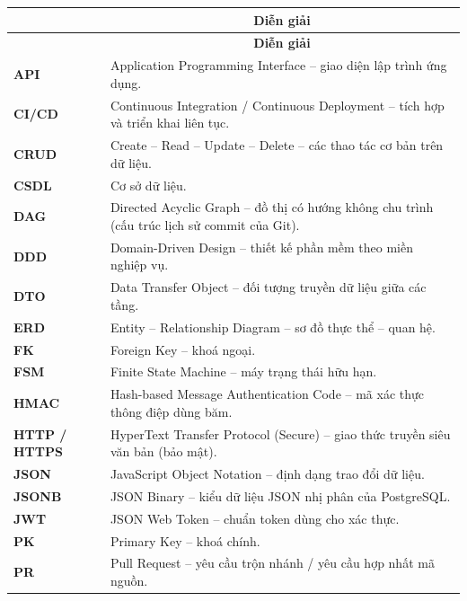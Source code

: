 
\renewcommand{\arraystretch}{1.3}
\begin{longtable}{|>{\bfseries}p{2.8cm}|p{11.0cm}|}
\hline
\rowcolor{sgCream}
\multicolumn{1}{|c|}{\textbf{Từ viết tắt}} & \multicolumn{1}{c|}{\textbf{Diễn giải}}\\
\hline
\endfirsthead
\hline
\rowcolor{sgCream}
\multicolumn{1}{|c|}{\textbf{Từ viết tắt}} & \multicolumn{1}{c|}{\textbf{Diễn giải}}\\
\hline
\endhead
API    & Application Programming Interface -- giao diện lập trình ứng dụng.\\\hline
CI/CD  & Continuous Integration / Continuous Deployment -- tích hợp và triển khai liên tục.\\\hline
CRUD   & Create -- Read -- Update -- Delete -- các thao tác cơ bản trên dữ liệu.\\\hline
CSDL   & Cơ sở dữ liệu.\\\hline
DAG    & Directed Acyclic Graph -- đồ thị có hướng không chu trình (cấu trúc lịch sử commit của Git).\\\hline
DDD    & Domain-Driven Design -- thiết kế phần mềm theo miền nghiệp vụ.\\\hline
DTO    & Data Transfer Object -- đối tượng truyền dữ liệu giữa các tầng.\\\hline
ERD    & Entity -- Relationship Diagram -- sơ đồ thực thể -- quan hệ.\\\hline
FK     & Foreign Key -- khoá ngoại.\\\hline
FSM    & Finite State Machine -- máy trạng thái hữu hạn.\\\hline
HMAC   & Hash-based Message Authentication Code -- mã xác thực thông điệp dùng băm.\\\hline
HTTP / HTTPS & HyperText Transfer Protocol (Secure) -- giao thức truyền siêu văn bản (bảo mật).\\\hline
JSON   & JavaScript Object Notation -- định dạng trao đổi dữ liệu.\\\hline
JSONB  & JSON Binary -- kiểu dữ liệu JSON nhị phân của PostgreSQL.\\\hline
JWT    & JSON Web Token -- chuẩn token dùng cho xác thực.\\\hline
PK     & Primary Key -- khoá chính.\\\hline
PR     & Pull Request -- yêu cầu trộn nhánh / yêu cầu hợp nhất mã nguồn.\\\hline

\end{longtable}
